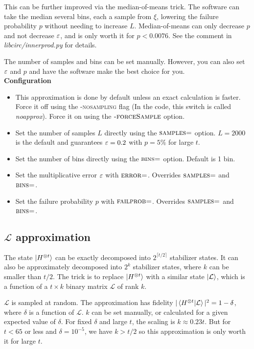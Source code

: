 \documentclass[11pt]{article}
\begin{document}
This can be further improved via the median-of-means trick. The software can take the median several bins, each a sample from $\xi$, lowering the failure probability $p$ without needing to increase $L$. Median-of-means can only decrease $p$ and not decrease $\varepsilon$, and is only worth it for $p < 0.0076$. See the comment in \textit{libcirc/innerprod.py} for details.

The number of samples and bins can be set manually. However, you can also set $\varepsilon$ and $p$ and have the software make the best choice for you.\\

\noindent \textbf{Configuration}
\begin{itemize}
    \item This approximation is done by default unless an exact calculation is faster. Force it off using the \textsc{-nosampling} flag (In the code, this switch is called \textit{noapprox}). Force it on using the $\textsc{-forceSample}$ option.
    \item Set the number of samples $L$ directly using the $\textsc{samples=}$ option. $L=2000$ is the default and guarantees $\varepsilon = 0.2$ with $p = 5\%$ for large $t$.
    \item Set the number of bins directly using the $\textsc{bins=}$ option. Default is 1 bin.
    \item Set the multiplicative error $\varepsilon$ with $\textsc{error=}$. Overrides $\textsc{samples=}$ and $\textsc{bins=}$.
    \item Set the failure probability $p$ with $\textsc{failprob=}$. Overrides $\textsc{samples=}$ and $\textsc{bins=}$.
\end{itemize}

\subsection{$\mathcal{L}$ approximation} \label{sec:msa}

The state $\ket{H^{\otimes t}}$ can be exactly decomposed into $2^{\lceil t/2\rceil}$ stabilizer states. It can also be approximately decomposed into  $2^{k}$ stabilizer states, where $k$ can be smaller than $t/2$. The trick is to replace $\ket{H^{\otimes t}}$ with a similar state $\ket{\mathcal{L}}$, which is a function of a $t \times k$ binary matrix $\mathcal{L}$ of rank $k$. 

$\mathcal{L}$ is sampled at random. The approximation has fidelity $|\braket{H^{\otimes t}|\mathcal{L}}|^2 = 1-\delta$, where $\delta$ is a function of $\mathcal{L}$. $k$ can be set manually, or calculated for a given expected value of $\delta$. For fixed $\delta$ and large $t$, the scaling is $k \approx 0.23 t$. But for $t < 65$ or less and $\delta = 10^{-5}$, we have $k > t/2$ so this approximation is only worth it for large $t$.
\end{document}
